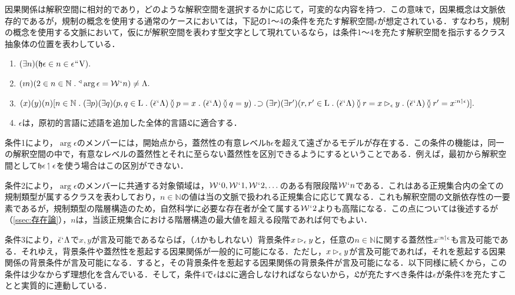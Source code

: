 因果関係は解釈空間に相対的であり，どのような解釈空間を選択するかに応じて，可変的な内容を持つ．この意味で，因果概念は文脈依存的であるが，規制の概念を使用する通常のケースにおいては，下記の1〜4の条件を充たす解釈空間$ \epsilon $が想定されている．すなわち，規制の概念を使用する文脈において，仮に\kagi{$ \beta $}が解釈空間を表わす型文字として現れているなら，\kagi{$ \beta $}は条件1〜4を充たす解釈空間を指示するクラス抽象体の位置を表わしている．
\begin{enumerate}
    \item $ (\exists n)(\mathfrak{h}\epsilon\in n \in\epsilon{\mspace{1mu}{``}\mspace{1mu}}\mathrm{V}). $
    \item $ (\imath n)(2\in n\in\mathbb{N}\con{1}\trgl{\arg{\epsilon}}=\mathcal{W}\fap n)\neq\Lambda. $
    \item $ (x)(y)(n)[n\in\mathbb{N}\con{1}(\exists p)(\exists q)(p,q\in\mathrm{L}\con{1}
        (\breve{\epsilon}\fap\Lambda)\exten p = x\con{1}(\breve{\epsilon}\fap\Lambda)\exten q = y
    )\case{1}{1}{0}
    \\\hfill
    (\exists r)(\exists r')(r,r'\in\mathrm{L}\con{1}(\breve{\epsilon}\fap\Lambda)\exten r = x\bkg{\epsilon}y
    \con{1}(\breve{\epsilon}\fap\Lambda)\exten r' = \prob{x}{n\uphl\epsilon}
    )
    ]. $
    \item $\epsilon$は，原初的言語に述語を追加した全体的言語$\mathfrak{L}$に適合する．
\end{enumerate}

条件1により，$ \arg\epsilon $のメンバーには，開始点から，蓋然性の有意レベル$\mathfrak{h}\epsilon$を超えて遠ざかるモデルが存在する．この条件の機能は，同一の解釈空間の中で，有意なレベルの蓋然性とそれに至らない蓋然性を区別できるようにするということである．例えば，最初から解釈空間として$ \mathfrak{h}\epsilon\mathbin{\upharpoonleft}\epsilon $を使う場合はこの区別ができない．

条件2により，$ \arg\epsilon $のメンバーに共通する対象領域は，$ \mathcal{W}{\mspace{1mu}{`}\mspace{1mu}} 0,\mathcal{W}{\mspace{1mu}{`}\mspace{1mu}} 1,\mathcal{W}{\mspace{1mu}{`}\mspace{1mu}} 2,\dots $のある有限段階$\mathcal{W}{\mspace{1mu}{`}\mspace{1mu}} n$である．これはある正規集合内の全ての規制類型が属するクラスを表わしており，$n\in\mathbb{N}$の値は当の文脈で扱われる正規集合に応じて異なる．これも解釈空間の文脈依存性の一要素であるが，規制類型の階層構造のため，自然科学に必要な存在者が全て属する$\mathcal{W}{\mspace{1mu}{`}\mspace{1mu}} 2$よりも高階になる．この点については後述するが（\ref{ssec:存在論}），$n$は，当該正規集合における階層構造の最大値を超える段階であれば何でもよい．

条件3により，$\breve{\epsilon}{\mspace{1mu}{`}\mspace{1mu}} \Lambda$で$x,y$が言及可能であるならば，（$\Lambda$かもしれない）背景条件$x\mathbin{\vartriangleright_{\epsilon}}y$と，任意の$n\in\mathbb{N}$に関する蓋然性$ x^{:n\mathbin{\upharpoonleft}\epsilon} $も言及可能である．それゆえ，背景条件や蓋然性を惹起する因果関係が一般的に可能になる．ただし，$x\mathbin{\vartriangleright_{\epsilon}}y$が言及可能であれば，それを惹起する因果関係の背景条件が言及可能になる．すると，その背景条件を惹起する因果関係の背景条件が言及可能になる．以下同様に続くから，この条件は少なからず理想化を含んでいる．そして，条件4で$\epsilon$は$\mathfrak{L}$に適合しなければならないから，$\mathfrak{L}$が充たすべき条件は$\epsilon$が条件3を充たすことと実質的に連動している．

